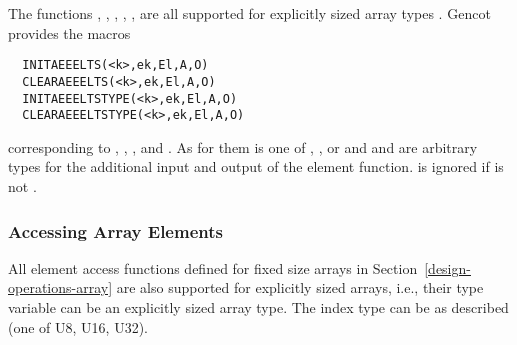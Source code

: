 The functions , , , , , 
 are all supported for explicitly sized array types . Gencot provides the macros
\begin{verbatim}
  INITAEEELTS(<k>,ek,El,A,O)
  CLEARAEEELTS(<k>,ek,El,A,O)
  INITAEEELTSTYPE(<k>,ek,El,A,O)
  CLEARAEEELTSTYPE(<k>,ek,El,A,O)
\end{verbatim}
corresponding to , , , and . As for them
 is one of , , or  and  and  are arbitrary types for the 
additional input and output of the element function.  is ignored if  is not .

\subsubsection{Accessing Array Elements}

All element access functions defined for fixed size arrays in Section~\ref{design-operations-array} are also supported for 
explicitly sized arrays, i.e., their type variable  can be an explicitly sized array type. The index type 
can be as described (one of U8, U16, U32).
